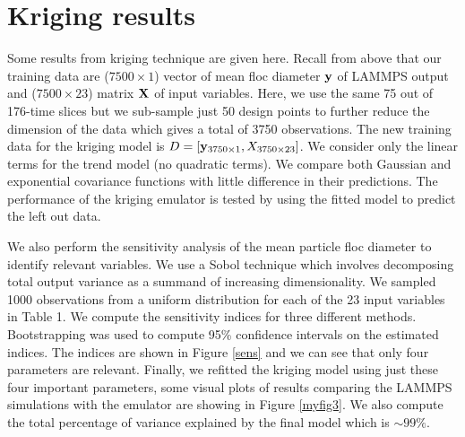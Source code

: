 \documentclass[12pt,titlepage]{report}
\newcommand{\bX}{{\bf X}}
\newcommand{\by}{{\bf y}}
\theoremstyle{definition}
\theoremstyle{remark}
\begin{document}
\section{Kriging results}
Some results from kriging technique are given here. Recall from above that our training data are ($7500 \times 1$) vector of mean floc diameter $\by$ of LAMMPS output and ($7500 \times 23$) matrix $\bX$ of input variables. Here, we use the same 75 out of 176-time slices but we sub-sample just 50 design points to further reduce the dimension of the data which gives a total of 3750 observations. The new training data for the kriging model is $D=[\by_{3750 \times 1}, X_{3750 \times 23}]$. We consider only the linear terms for the trend model (no quadratic terms). We compare both Gaussian and exponential covariance functions with little difference in their predictions. The performance of the kriging emulator is tested by using the fitted model to predict the left out data. 

We also perform the sensitivity analysis of the mean particle floc diameter to identify relevant variables. We use a Sobol technique which involves decomposing total output variance as a summand of increasing dimensionality. We sampled 1000 observations from a uniform distribution for each of the 23 input variables in Table 1. We compute the sensitivity indices for three different methods. Bootstrapping was used to compute 95\% confidence intervals on the estimated indices. The indices are shown in Figure \ref{sens} and we can see that only four parameters are relevant. Finally, we refitted the kriging model using just these four important parameters, some visual plots of results comparing the LAMMPS simulations with the emulator are showing in Figure \ref{myfig3}. We also compute the total percentage of variance explained by the final model which is $\sim 99\%$.
\end{document}
